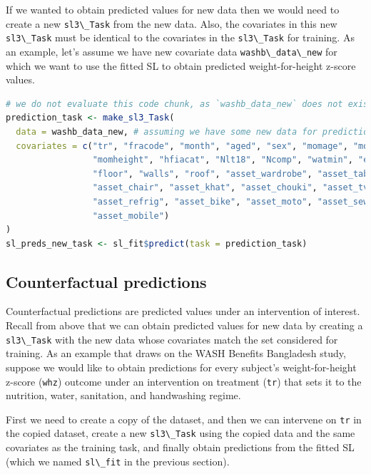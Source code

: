 \documentclass[
  12pt, krantz2,
]{krantz}
\newcommand{\passthrough}[1]{#1}
\newcommand{\1}{\mathbbm{1}}
\theoremstyle{definition}
\theoremstyle{definition}
\theoremstyle{definition}
\theoremstyle{definition}
\theoremstyle{remark}
\begin{document}
If we wanted to obtain predicted values for new data then we would need to
create a new \passthrough{\lstinline!sl3\_Task!} from the new data. Also, the covariates in this new
\passthrough{\lstinline!sl3\_Task!} must be identical to the covariates in the \passthrough{\lstinline!sl3\_Task!} for training.
As an example, let's assume we have new covariate data \passthrough{\lstinline!washb\_data\_new!} for
which we want to use the fitted SL to obtain predicted weight-for-height
z-score values.

\begin{lstlisting}[language=R]
# we do not evaluate this code chunk, as `washb_data_new` does not exist
prediction_task <- make_sl3_Task(
  data = washb_data_new, # assuming we have some new data for predictions
  covariates = c("tr", "fracode", "month", "aged", "sex", "momage", "momedu", 
                 "momheight", "hfiacat", "Nlt18", "Ncomp", "watmin", "elec", 
                 "floor", "walls", "roof", "asset_wardrobe", "asset_table", 
                 "asset_chair", "asset_khat", "asset_chouki", "asset_tv", 
                 "asset_refrig", "asset_bike", "asset_moto", "asset_sewmach", 
                 "asset_mobile")
)
sl_preds_new_task <- sl_fit$predict(task = prediction_task)
\end{lstlisting}

\hypertarget{counterfactual-predictions}{%
\subsection{Counterfactual predictions}\label{counterfactual-predictions}}

Counterfactual predictions are predicted values under an intervention of
interest. Recall from above that we can obtain predicted values for new data by
creating a \passthrough{\lstinline!sl3\_Task!} with the new data whose covariates match the set
considered for training. As an example that draws on the WASH Benefits
Bangladesh study, suppose we would like to obtain predictions for every
subject's weight-for-height z-score (\passthrough{\lstinline!whz!}) outcome under an intervention on
treatment (\passthrough{\lstinline!tr!}) that sets it to the nutrition, water, sanitation, and
handwashing regime.

First we need to create a copy of the dataset, and then we can intervene on
\passthrough{\lstinline!tr!} in the copied dataset, create a new \passthrough{\lstinline!sl3\_Task!} using the copied data and
the same covariates as the training task, and finally obtain predictions
from the fitted SL (which we named \passthrough{\lstinline!sl\_fit!} in the previous section).
\end{document}
